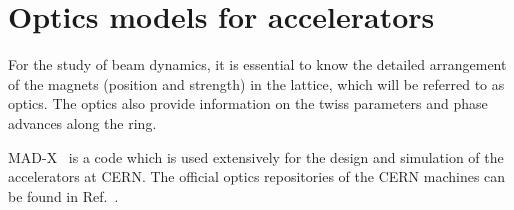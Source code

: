 




\section{Optics models for accelerators}\label{sec:optics_model_designs}
For the study of beam dynamics, it is essential to know the detailed arrangement of the magnets (position and strength) in the lattice, which will be referred to as optics. The optics also provide information on the twiss parameters and phase advances along the ring.

MAD-X~\cite{madx} is a code which is used extensively for the design and simulation of the accelerators at CERN. The official optics repositories of the CERN machines can be found in Ref.~\cite{cern_optics_repo}.

